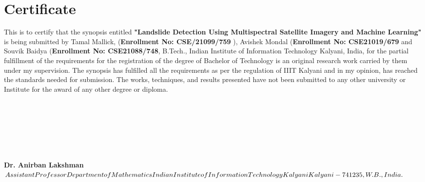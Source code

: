 \documentclass[12pt,a4paper]{report}
\newcommand{\mytitle}{Landslide Detection Using Multispectral Satellite Imagery and Machine Learning}
\begin{document}
%
	\newpage
	\chapter*{\centering Certificate}
\label{sec:engack}
This is to certify that the synopsis entitled \textbf{"\mytitle "} is being submitted by Tamal Mallick,
 (\textbf{Enrollment No: CSE/21099/759 }), Avishek Mondal (\textbf{Enrollment No: CSE21019/679} and Souvik Baidya (\textbf{Enrollment No: CSE21088/748}, B.Tech., Indian Institute of Information Technology Kalyani, India, for the partial fulfillment of the requirements for the registration of the degree of Bachelor of Technology is an original research work carried by them under my supervision. The synopsis has fulfilled all the requirements as per the regulation of IIIT Kalyani and in my opinion, has reached the standards needed for submission. The works, techniques, and results presented have not been submitted to any other university or Institute for the award of any other degree or diploma.
\\
\\
\\
\\
\\
\\
\\
\\
\textbf{Dr. Anirban Lakshman}  \\ 
$Assistant Professor \\  
Department of Mathematics\\
Indian Institute of Information Technology Kalyani\\
Kalyani-741235, W.B., India.
$
\cleardoublepage
\end{document}

